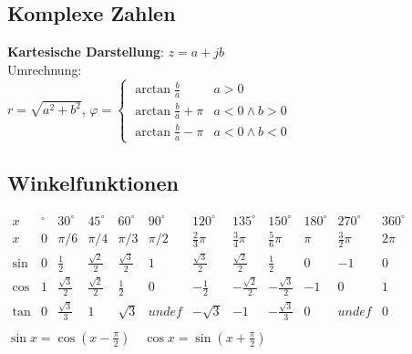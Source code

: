 \subsection{Komplexe Zahlen}
\textbf{Kartesische Darstellung}: $z = a + j b$\\

Umrechnung:\\
$r = \sqrt{a^2 + b^2}$, $\varphi = \begin{cases}
        \arctan\frac{b}{a}     & a>0            \\
        \arctan\frac{b}{a}+\pi & a<0 \wedge b>0 \\
        \arctan\frac{b}{a}-\pi & a<0 \wedge b<0
    \end{cases}$

\subsection{Winkelfunktionen}
\scalebox{0.77}
{
    $\begin{array}{c|c|c|c|c|c|c|c|c|c|c|c}
            x    & ^{\circ} & 30^{\circ}         & 45^{\circ}         & 60^{\circ}        & 90^{\circ} & 120^{\circ}       & 135^{\circ}         & 150^{\circ}         & 180^{\circ} & 270^{\circ}    & 360^{\circ} \\ \hline
            x    & 0        & \pi / 6            & \pi / 4            & \pi / 3           & \pi / 2    & \frac{2}{3}\pi    & \frac{3}{4}\pi      & \frac{5}{6}\pi      & \pi         & \frac{3}{2}\pi & 2 \pi       \\ \hline
            \sin & 0        & \frac{1}{2}        & \frac{\sqrt{2}}{2} & \frac{\sqrt 3}{2} & 1          & \frac{\sqrt 3}{2} & \frac{\sqrt{2}}{2}  & \frac{1}{2}         & 0           & -1             & 0           \\
            \cos & 1        & \frac{\sqrt 3}{2}  & \frac{\sqrt{2}}{2} & \frac{1}{2}       & 0          & -\frac{1}{2}      & -\frac{\sqrt{2}}{2} & -\frac{\sqrt 3}{2}  & -1          & 0              & 1           \\
            \tan & 0        & \frac{\sqrt{3}}{3} & 1                  & \sqrt{3}          & undef      & -\sqrt{3}         & -1                  & -\frac{\sqrt{3}}{3} & 0           & undef          & 0           \\
        \end{array}$
}
$\sin x = \cos(x-\frac{\pi}{2}) \quad \cos x = \sin(x + \frac{\pi}{2})$
